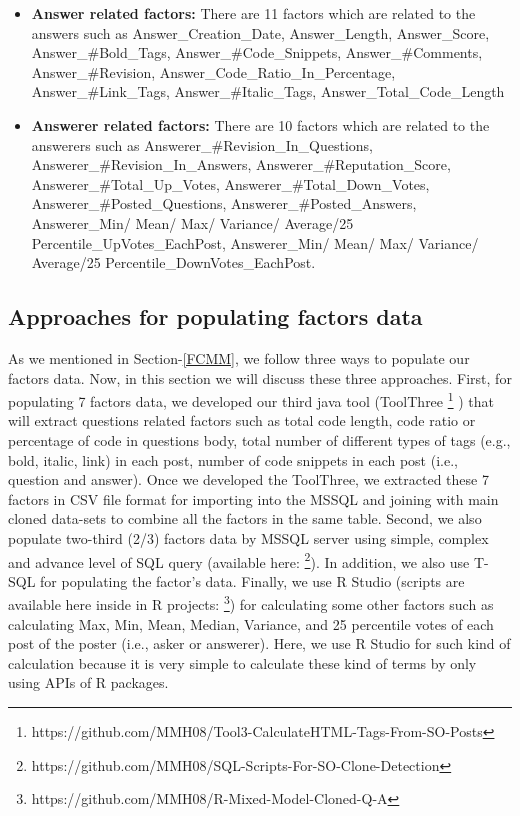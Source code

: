 \documentclass[conference]{IEEEtran}
\begin{document}
\begin{itemize}
	\item \textbf{Answer related factors: } There are 11 factors which are related to the answers such as Answer\_Creation\_Date, Answer\_Length, Answer\_Score, Answer\_\#Bold\_Tags, Answer\_\#Code\_Snippets, Answer\_\#Comments, Answer\_\#Revision, Answer\_Code\_Ratio\_In\_Percentage,  Answer\_\#Link\_Tags, Answer\_\#Italic\_Tags, Answer\_Total\_Code\_Length
	\item \textbf{Answerer related factors: } There are 10 factors which are related to the answerers such as Answerer\_\#Revision\_In\_Questions, Answerer\_\#Revision\_In\_Answers, Answerer\_\#Reputation\_Score, Answerer\_\#Total\_Up\_Votes, Answerer\_\#Total\_Down\_Votes, Answerer\_\#Posted\_Questions, Answerer\_\#Posted\_Answers, 
	Answerer\_Min/ Mean/ Max/ Variance/ Average/25 Percentile\_UpVotes\_EachPost, Answerer\_Min/ Mean/ Max/ Variance/ Average/25 Percentile\_DownVotes\_EachPost.
	
\end{itemize}

\subsection{Approaches for populating factors data}
As we mentioned in Section-\ref{FCMM}, we follow three ways to populate our factors data. Now, in this section we will discuss these three approaches. First, for populating 7 factors data, we developed our third java tool (ToolThree \footnote{https://github.com/MMH08/Tool3-CalculateHTML-Tags-From-SO-Posts} ) that will extract questions related factors such as total code length, code ratio or percentage of code in questions body, total number of different types of tags (e.g., bold, italic, link) in each post, number of code snippets in each post (i.e., question and answer). Once we developed the ToolThree, we extracted these 7 factors in CSV file format for importing into the MSSQL and joining with main cloned data-sets to combine all the factors in the same table. Second, we also populate two-third (2/3) factors data by MSSQL server using simple, complex and advance level of SQL query (available here: \footnote{https://github.com/MMH08/SQL-Scripts-For-SO-Clone-Detection}). In addition, we also use T-SQL for populating the factor's data. Finally, we use R Studio (scripts are available here inside in R projects: \footnote{https://github.com/MMH08/R-Mixed-Model-Cloned-Q-A}) for calculating some other factors such as  calculating Max, Min, Mean, Median, Variance, and 25 percentile votes of each post of the poster (i.e., asker or answerer). Here, we use R Studio for such kind of calculation because it is very simple to calculate these kind of terms by only using APIs of R packages. 
\end{document}
